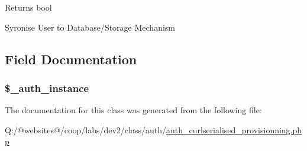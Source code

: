\begin{DoxyReturn}{Returns}
bool 
\end{DoxyReturn}
Syronise User to Database/\-Storage Mechanism

\subsection{Field Documentation}
\hypertarget{class_xortify_auth_curlserialised_provisionning_a486ed878bb5a7188c99ac4c9ee46ac6e}{
\subsubsection[{\$\-\_\-auth\-\_\-instance}]{\setlength{\rightskip}{0pt plus 5cm}\$\-\_\-auth\-\_\-instance}}\label{class_xortify_auth_curlserialised_provisionning_a486ed878bb5a7188c99ac4c9ee46ac6e}


The documentation for this class was generated from the following file\-:\begin{DoxyCompactItemize}
\item 
Q\-:/@websites@/coop/labs/dev2/class/auth/\hyperlink{auth__curlserialised__provisionning_8php}{auth\-\_\-curlserialised\-\_\-provisionning.\-php}\end{DoxyCompactItemize}
